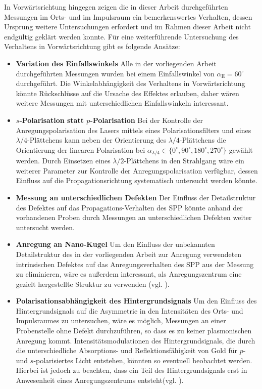 \documentclass[a4paper, titlepage,  ngerman]{book}
\begin{document}
	In Vorwärtsrichtung hingegen zeigen die in dieser Arbeit durchgeführten Messungen im Orts- und im Impulsraum ein bemerkenswertes Verhalten, dessen Ursprung weitere Untersuchungen erfordert und im Rahmen dieser Arbeit nicht endgültig geklärt werden konnte. Für eine weiterführende Untersuchung des Verhaltens in Vorwärtsrichtung gibt es folgende Ansätze:
	\begin{itemize}
		\item \textbf{Variation des Einfallswinkels} Alle in der vorliegenden Arbeit durchgeführten Messungen wurden bei einem Einfallswinkel von $\alpha_{\mathrm{E}} = 60^\circ$ durchgeführt. Die Winkelabhängigkeit des Verhaltens in Vorwärtsrichtung könnte Rückschlüsse auf die Ursache des Effektes erlauben, daher wären weitere Messungen mit unterschiedlichen Einfallswinkeln interessant.
		\item \textbf{$s$-Polarisation statt $p$-Polarisation} Bei der Kontrolle der Anregungspolarisation des Lasers mittels eines Polarisationsfilters und eines $\lambda / 4$-Plättchens kann neben der Orientierung  des $\lambda / 4$-Plättchens die Orientierung der linearen Polarisation bei $\alpha_{\lambda /4} \in \{0^\circ, 90^\circ, 180^\circ, 270^\circ\}$ gewählt werden. Durch Einsetzen eines $\lambda /2$-Plättchens in den Strahlgang wäre ein weiterer Parameter zur Kontrolle der Anregungspolarisation verfügbar, dessen Einfluss auf die Propagationsrichtung systematisch untersucht werden könnte.
		\item \textbf{Messung an unterschiedlichen Defekten} Der Einfluss der Detailstruktur des Defektes auf das Propagations-Verhalten des SPP könnte anhand der vorhandenen Proben durch Messungen an unterschiedlichen Defekten weiter untersucht werden.
		\item \textbf{Anregung an Nano-Kugel} Um den Einfluss der unbekannten Detailstruktur des in der vorliegenden Arbeit zur Anregung verwendeten intrinsischen Defektes auf das Anregungsverhalten des SPP aus der Messung zu eliminieren, wäre es außerdem interessant, als Anregungszentrum eine gezielt hergestellte Struktur zu verwenden (vgl. \cite{OConnor.2014}). 
		\item \textbf{Polarisationsabhängigkeit des Hintergrundsignals} Um den Einfluss des Hintergrundsignals auf die Asymmetrie in den Intensitäten des Orts- und Impulsraumes zu untersuchen, wäre es möglich, Messungen an einer Probenstelle ohne Defekt durchzuführen, so dass es zu keiner plasmonischen Anregung kommt. Intensitätsmodulationen des Hintergrundsignals, die durch die unterschiedliche Absorptions- und Reflektionsfähigkeit von Gold für $p$- und $s$-polarisiertes Licht entstehen, könnten so eventuell beobachtet werden. Hierbei ist jedoch zu beachten, dass ein Teil des Hintergrundsignals erst in Anwesenheit eines Anregungszentrums entsteht(vgl. \cite{Drezet.2008}).
	\end{itemize}
	\appendix
		
	\newpage
\end{document}
